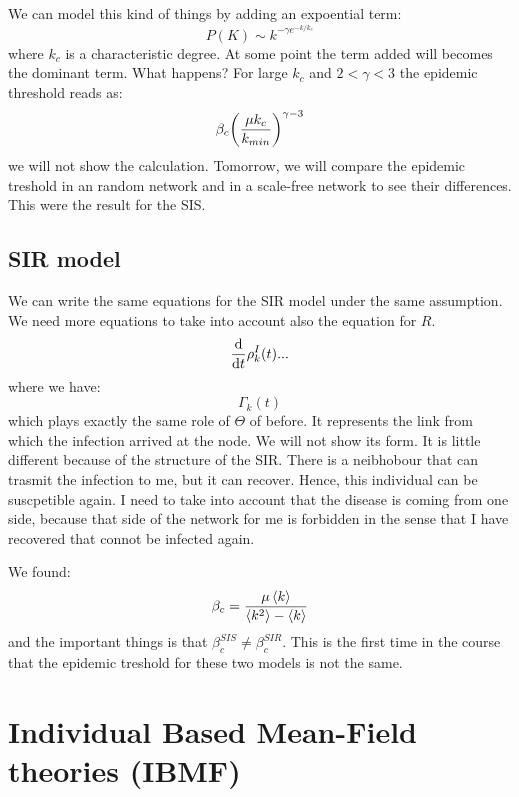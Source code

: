 \documentclass[../main/main.tex]{subfiles}
\begin{document}
 We can model this kind of things by adding an expoential term:
 \begin{equation*}
   P(K) \sim k^{- \gamma   e^{-k/k_c} }
 \end{equation*}
where \( k_c \) is a characteristic degree. At some point the term added will becomes the dominant term. What happens? For large \( k_c \) and \( 2 < \gamma < 3  \) the epidemic threshold reads as:
\begin{equation*}
  \beta _c \qty(\frac{\mu k_c}{k_{min}})^{\gamma -3 }
\end{equation*}
we will not show the calculation. Tomorrow, we will compare the epidemic treshold in an random network and in a scale-free network to see their differences.
This were the result for the SIS.

\subsection{SIR model}
We can write the same equations for the SIR model under the same assumption. We need more equations to take into account also the equation for \( R \).
\begin{equation*}
  \dv{}{t} \rho _k^I(t) ...
\end{equation*}
where we have:
\begin{equation*}
  \Gamma _k (t)
\end{equation*}
which plays exactly the same role of \( \Theta  \) of before. It represents the link from which the infection arrived at the node. We will not show its form.  It is little different because of the structure of the SIR.
There is a neibhobour that can trasmit the infection to me, but it can recover. Hence, this individual can be suscpetible again.
I need to take into account that the disease is coming from one side, because that side of the network for me is forbidden in the sense that I have recovered that connot be infected again.

We found:
\begin{equation*}
  \beta _c = \frac{\mu \expval{k} }{\expval{k^2} - \expval{k} }
\end{equation*}
and the important things is that \( \beta _c^{SIS} \neq \beta _c^{SIR} \). This is the first time in the course that the epidemic treshold for these two models is not the same.

\section{Individual Based Mean-Field theories (IBMF)}
\end{document}
